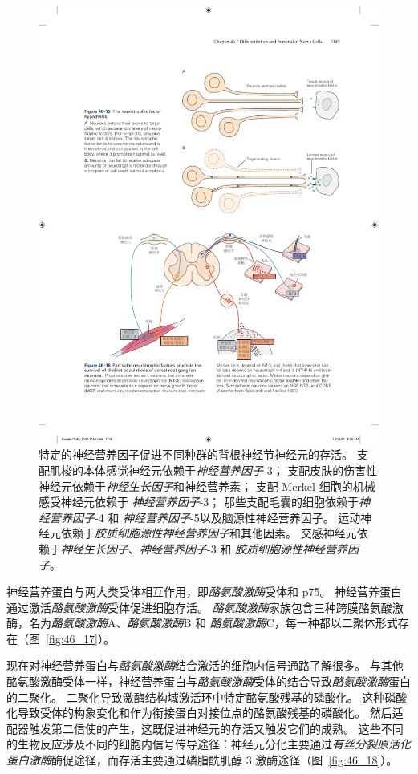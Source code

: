 \begin{figure}[htbp]
	\centering
	\includegraphics[width=0.8\linewidth]{chap46/fig_46_16}
	\caption{特定的神经营养因子促进不同种群的背根神经节神经元的存活。
		支配肌梭的本体感觉神经元依赖于\textit{神经营养因子}-3；
		支配皮肤的伤害性神经元依赖于\textit{神经生长因子}和神经营养素；
		支配 Merkel 细胞的机械感受神经元依赖于 \textit{神经营养因子}-3；
		那些支配毛囊的细胞依赖于\textit{神经营养因子}-4 和 \textit{神经营养因子}-5以及脑源性神经营养因子。
		运动神经元依赖于\textit{胶质细胞源性神经营养因子}和其他因素。
		交感神经元依赖于\textit{神经生长因子}、\textit{神经营养因子}-3 和 \textit{胶质细胞源性神经营养因子}\cite{reichardt1997neurotrophic}。}
	\label{fig:46_16}
\end{figure}


神经营养蛋白与两大类受体相互作用，即\textit{酪氨酸激酶}受体和 p75。
神经营养蛋白通过激活\textit{酪氨酸激酶}受体促进细胞存活。
\textit{酪氨酸激酶}家族包含三种跨膜酪氨酸激酶，名为\textit{酪氨酸激酶}A、\textit{酪氨酸激酶}B 和 \textit{酪氨酸激酶}C，每一种都以二聚体形式存在（图~\ref{fig:46_17}）。


现在对神经营养蛋白与\textit{酪氨酸激酶}结合激活的细胞内信号通路了解很多。
与其他酪氨酸激酶受体一样，神经营养蛋白与\textit{酪氨酸激酶}受体的结合导致\textit{酪氨酸激酶}蛋白的二聚化。
二聚化导致激酶结构域激活环中特定酪氨酸残基的磷酸化。
这种磷酸化导致受体的构象变化和作为衔接蛋白对接位点的酪氨酸残基的磷酸化。
然后适配器触发第二信使的产生，这既促进神经元的存活又触发它们的成熟。
这些不同的生物反应涉及不同的细胞内信号传导途径：神经元分化主要通过\textit{有丝分裂原活化蛋白激酶}酶促途径，而存活主要通过磷脂酰肌醇 3 激酶途径（图~\ref{fig:46_18}）。


